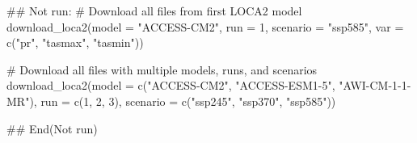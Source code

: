 %
\begin{SeeAlso}
\end{SeeAlso}
%
\begin{Examples}
\begin{ExampleCode}
## Not run: 
# Download all files from first LOCA2 model
download_loca2(model = "ACCESS-CM2",
               run = 1,
               scenario = "ssp585",
               var = c("pr", "tasmax", "tasmin"))

# Download all files with multiple models, runs, and scenarios
download_loca2(model = c("ACCESS-CM2", "ACCESS-ESM1-5", "AWI-CM-1-1-MR"),
               run = c(1, 2, 3),
               scenario = c("ssp245", "ssp370", "ssp585"))

## End(Not run)
\end{ExampleCode}
\end{Examples}
